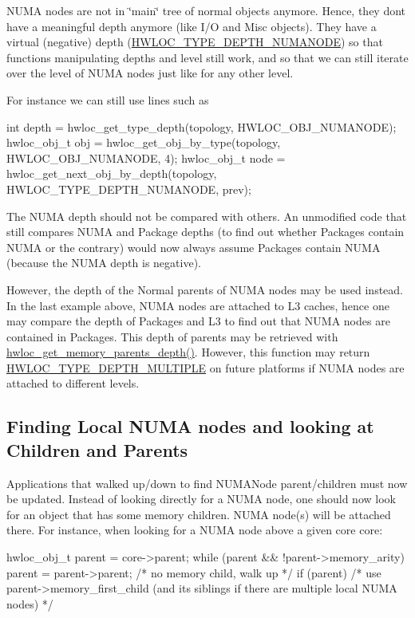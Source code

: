 N\+U\+MA nodes are not in \char`\"{}main\char`\"{} tree of normal objects anymore. Hence, they don\textquotesingle{}t have a meaningful depth anymore (like I/O and Misc objects). They have a virtual (negative) depth (\hyperlink{a00187_ggaf4e663cf42bbe20756b849c6293ef575a245c34ec9884c2cf5de5049b2153ed9c}{H\+W\+L\+O\+C\+\_\+\+T\+Y\+P\+E\+\_\+\+D\+E\+P\+T\+H\+\_\+\+N\+U\+M\+A\+N\+O\+DE}) so that functions manipulating depths and level still work, and so that we can still iterate over the level of N\+U\+MA nodes just like for any other level.

For instance we can still use lines such as \begin{DoxyVerb}int depth = hwloc_get_type_depth(topology, HWLOC_OBJ_NUMANODE);
hwloc_obj_t obj = hwloc_get_obj_by_type(topology, HWLOC_OBJ_NUMANODE, 4);
hwloc_obj_t node = hwloc_get_next_obj_by_depth(topology, HWLOC_TYPE_DEPTH_NUMANODE, prev);
\end{DoxyVerb}


The N\+U\+MA depth should not be compared with others. An unmodified code that still compares N\+U\+MA and Package depths (to find out whether Packages contain N\+U\+MA or the contrary) would now always assume Packages contain N\+U\+MA (because the N\+U\+MA depth is negative).

However, the depth of the Normal parents of N\+U\+MA nodes may be used instead. In the last example above, N\+U\+MA nodes are attached to L3 caches, hence one may compare the depth of Packages and L3 to find out that N\+U\+MA nodes are contained in Packages. This depth of parents may be retrieved with \hyperlink{a00187_gae85786340b88e24835f8c403a1e2e54b}{hwloc\+\_\+get\+\_\+memory\+\_\+parents\+\_\+depth()}. However, this function may return \hyperlink{a00187_ggaf4e663cf42bbe20756b849c6293ef575ae99465995cacde6c210d5fc2e409798c}{H\+W\+L\+O\+C\+\_\+\+T\+Y\+P\+E\+\_\+\+D\+E\+P\+T\+H\+\_\+\+M\+U\+L\+T\+I\+P\+LE} on future platforms if N\+U\+MA nodes are attached to different levels.\hypertarget{a00395_upgrade_to_api_2x_memory_find}{}\subsection{Finding Local N\+U\+M\+A nodes and looking at Children and Parents}\label{a00395_upgrade_to_api_2x_memory_find}
Applications that walked up/down to find N\+U\+M\+A\+Node parent/children must now be updated. Instead of looking directly for a N\+U\+MA node, one should now look for an object that has some memory children. N\+U\+MA node(s) will be attached there. For instance, when looking for a N\+U\+MA node above a given core {\ttfamily core}\+: \begin{DoxyVerb}hwloc_obj_t parent = core->parent;
while (parent && !parent->memory_arity)
  parent = parent->parent; /* no memory child, walk up */
if (parent)
  /* use parent->memory_first_child (and its siblings if there are multiple local NUMA nodes) */
\end{DoxyVerb}


